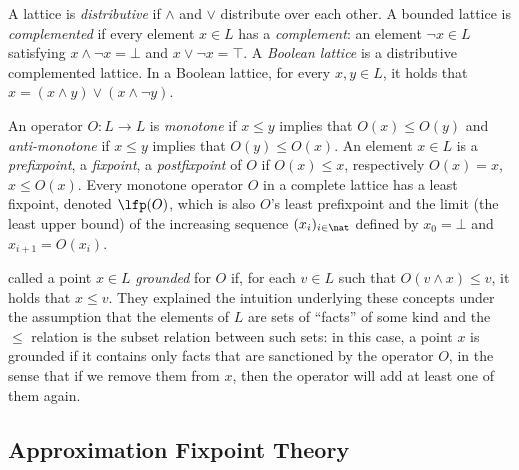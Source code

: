 A lattice is \emph{distributive} if $\land$ and $\lor$ distribute over each other. A bounded lattice is \emph{complemented} if every element $x\in L$ has a \emph{complement}: an element $\lnot x \in L$ satisfying $x\land \lnot x  = \bot$ and $x\lor \lnot x =\top$.
A \emph{Boolean lattice} is a distributive complemented lattice. 
In a Boolean lattice, for every $x,y \in L$, it holds that $x=(x\land y) \lor (x\land \lnot y)$.



An operator $O:L\to L$ is \emph{monotone} if $x\leq y$ implies that $O(x)\leq O(y)$ and \emph{anti-monotone} if $x\leq y$ implies that $O(y)\leq O(x)$. An element $x\in L$ is a \emph{prefixpoint}, a \emph{fixpoint}, a \emph{postfixpoint} of $O$ if $O(x)\leq x$, respectively $O(x)=x$, $x\leq O(x)$. 
Every monotone operator $O$ in a %
complete lattice has a least fixpoint, denoted $\lfp(O)$, which is also $O$'s least prefixpoint and the limit (the least upper bound) of the increasing sequence $(x_i)_{i \in \nat}$ defined by $x_0=\bot$ and $x_{i+1} = O(x_i)$. 


 called a point  $x\in L$ \emph{grounded} for $O$ if, for each $v\in L$ such that $O(v\land x)\leq v$, it holds that $x\leq v$.
They explained the intuition underlying these concepts under the assumption that the elements of $L$ are sets of ``facts'' of some kind and the $\leq$ relation is the subset relation between such sets:
in this case, a point $x$ is grounded if it contains only facts that are sanctioned by the operator $O$, 
in the sense that if we remove them from $x$, then the operator will add at least one of them again. 



\subsection{Approximation Fixpoint Theory}



